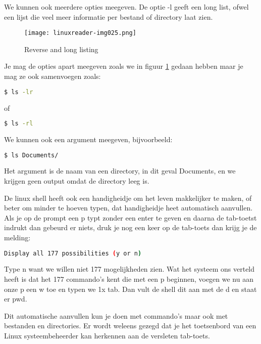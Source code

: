 We kunnen ook meerdere opties meegeven. De optie -l geeft een long
list, ofwel een lijst die veel meer informatie per bestand of directory laat zien.
\begin{figure}[h]
\texttt{[image: linuxreader-img025.png]}
	\label{fig:lslDir}
	\caption{Reverse and long listing}
\end{figure}
Je mag de opties apart meegeven
zoals we in figuur \ref{fig:lslDir} gedaan hebben maar je mag ze ook samenvoegen zoals:

\begin{lstlisting}[language=bash]
$ ls -lr
\end{lstlisting}
of
\begin{lstlisting}[language=bash]
$ ls -rl
\end{lstlisting}

We kunnen ook een argument meegeven, bijvoorbeeld:
\begin{lstlisting}[language=bash]
$ ls Documents/
\end{lstlisting}
Het argument is de naam van een directory, in dit geval Documents, en we krijgen geen output omdat de directory leeg
is.

De linux shell heeft ook een handigheidje om het leven makkelijker te maken, of beter om minder te hoeven typen, dat
handigheidje heet automatisch aanvullen. Als je op de prompt een p typt zonder een enter te geven en daarna de
tab-toetst indrukt dan gebeurd er niets, druk je nog een keer op de tab-toets dan krijg je de melding:

\begin{lstlisting}[language=bash]
Display all 177 possibilities (y or n)
\end{lstlisting}

Type n want we willen niet 177 mogelijkheden zien. Wat het systeem ons verteld heeft is dat het 177 commando's kent die
met een p beginnen, voegen we nu aan onze p een w toe en typen we 1x tab. Dan vult de shell dit aan met de d en staat
er pwd.

Dit automatische aanvullen kun je doen met commando's maar ook met bestanden en directories. Er wordt weleens gezegd dat
je het toetsenbord van een Linux systeembeheerder kan herkennen aan de versleten tab-toets.

